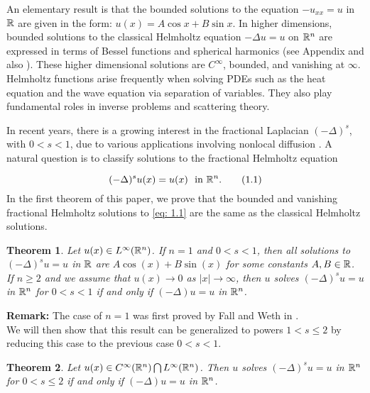 \documentclass{article}
\newtheorem{theorem}{Theorem}[section]
\begin{document}
\indent

An elementary result is that the bounded solutions to the equation $-u_{xx} = u$ in $\mathbb{R}$ are given in the form: $u(x)=A\cos{x} + B\sin{x}$. In higher dimensions, bounded solutions to the classical Helmholtz equation $-\Delta u = u$ on $\mathbb{R}^n$ are expressed in terms of Bessel functions and spherical harmonics (see Appendix and also \cite{Agmon}). These higher dimensional solutions are $C^\infty$, bounded, and vanishing at $\infty$. Helmholtz functions arise frequently when solving PDEs such as the heat equation and the wave equation via separation of variables. They also play fundamental roles in inverse problems and scattering theory. %

In recent years, there is a  growing interest in the fractional Laplacian $(-\Delta)^s$, with $0<s<1$, due to various applications  involving nonlocal diffusion \cite{2016}. A natural question is to classify  solutions to the fractional Helmholtz equation

\begin{equation}    (-\Delta)^s u(x) = u(x) \ \ \mbox{in} \ \R^n.
\tag{1.1}\label{eq: 1.1}
\end{equation}
In the first theorem of this paper, we prove that the bounded and vanishing fractional Helmholtz solutions to \eqref{eq: 1.1} are the same as the classical Helmholtz solutions.

\begin{theorem} 
\label{Th 1.1}
Let $u(x) \in L^\infty(\mathbb{R}^n)$. If $n=1$ and $0<s<1$, then all solutions to $(-\Delta)^s u = u$  in $\mathbb{R}$ are $ A \cos (x)+B \sin (x)$ for some constants $A,B \in \mathbb{R}$. If $n\geq 2$ and we assume that  $u(x) \to 0$ as $|x| \to \infty$, then $u$ solves $(-\Delta)^s u = u$  in $\mathbb{R}^n$ for $0<s<1$ if and only if $(-\Delta) u = u$ in $\mathbb{R}^n$.
\end{theorem}

\noindent
{\bf Remark:} The case of $n=1$ was first proved by Fall and Weth in \cite{FallWeth}.\\


We will then show that this result can be generalized to powers $1<s \le 2$ by reducing this case to the previous case $0<s<1$.

\begin{theorem}
\label{Th 1.2}
Let $u(x) \in C^\infty(\mathbb{R}^n) \bigcap L^\infty(\mathbb{R}^n)$. Then $u$ solves  $(-\Delta)^s u = u$  in $\mathbb{R}^n$ for $0<s \le 2$ if and only if $(-\Delta) u = u$ in $\mathbb{R}^n$. 
\end{theorem}
\end{document}
